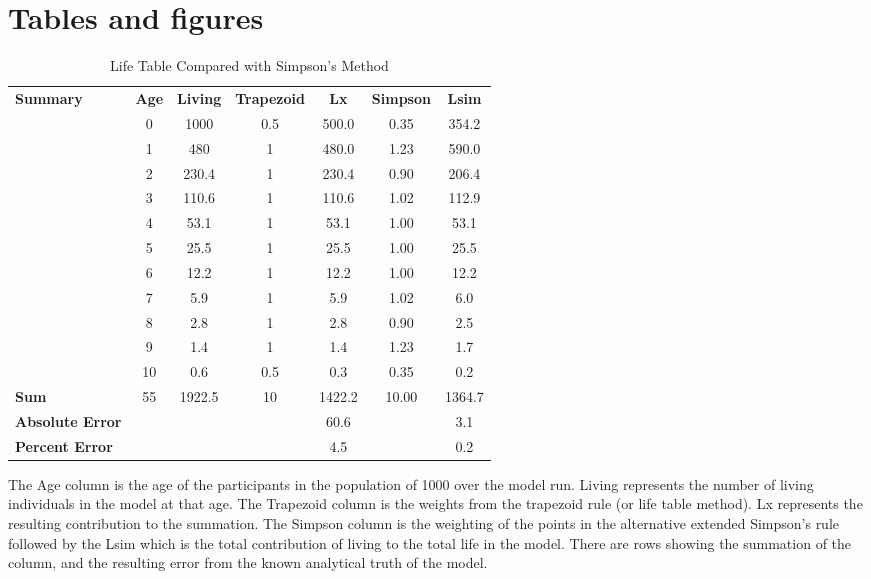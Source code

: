 \documentclass[]{article}
\begin{document}
\section{Tables and figures}




\begin{table}[H]
\centering
{\selectfont
{}
{\renewcommand{\arraystretch}{1.2}\begin{tabular}{|lcccccc|}
\hline
\rowcolor{nejm-header}\multicolumn{7}{|l|}{Barendregt Life Table Compared with Simpsons Method} \\
\hline
\textbf{Summary} & \textbf{Age} & \textbf{Living} & \textbf{Trapezoid} & \textbf{Lx} & \textbf{Simpson} & \textbf{Lsim}\\
\textbf{} & 0 & 1000 & 0.5 & 500.0 & 0.35 & 354.2\\
\textbf{} & 1 & 480 & 1 & 480.0 & 1.23 & 590.0\\
\textbf{} & 2 & 230.4 & 1 & 230.4 & 0.90 & 206.4\\
\textbf{} & 3 & 110.6 & 1 & 110.6 & 1.02 & 112.9\\
\textbf{} & 4 & 53.1 & 1 & 53.1 & 1.00 & 53.1\\
\textbf{} & 5 & 25.5 & 1 & 25.5 & 1.00 & 25.5\\
\textbf{} & 6 & 12.2 & 1 & 12.2 & 1.00 & 12.2\\
\textbf{} & 7 & 5.9 & 1 & 5.9 & 1.02 & 6.0\\
\textbf{} & 8 & 2.8 & 1 & 2.8 & 0.90 & 2.5\\
\textbf{} & 9 & 1.4 & 1 & 1.4 & 1.23 & 1.7\\
\textbf{} & 10 & 0.6 & 0.5 & 0.3 & 0.35 & 0.2\\
\textbf{Sum} & 55 & 1922.5 & 10 & 1422.2 & 10.00 & 1364.7\\
\textbf{Absolute Error} &  &  &  & 60.6 &  & 3.1\\
\textbf{Percent Error} &  &  &  & 4.5 &  & 0.2\\
\hline
\end{tabular}}
}
\caption{Life Table Compared with Simpson's Method}

The Age column is the age of the participants in the population of 1000
over the model run. Living represents the number of living individuals
in the model at that age. The Trapezoid column is the weights from the
trapezoid rule (or life table method). Lx represents the resulting
contribution to the summation. The Simpson column is the weighting of
the points in the alternative extended Simpson's rule followed by the
Lsim which is the total contribution of living to the total life in the
model. There are rows showing the summation of the column, and the
resulting error from the known analytical truth of the model.

\end{table}
\end{document}
